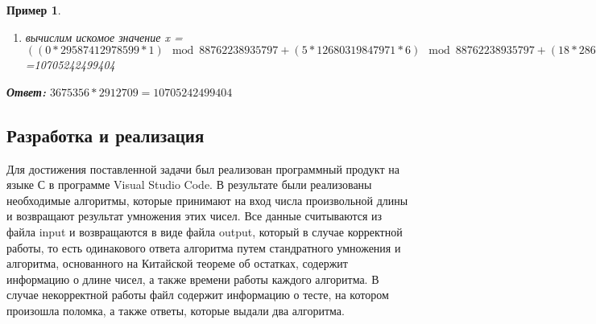 \documentclass[14pt, russian]{scrartcl}
\newcounter{cExample}
\newtheorem{Example}{Пример}[cExample]
\begin{document}
\begin{Example}
{\begin{enumerate}
    \begin{equation*}
        \begin{cases}
        M_{1}^{-1}=1, 
        \\
        M_{2}^{-1}=6,
        \\
        M_{3}^{-1}=3,
        \\
        M_{4}^{-1}=34,
        \\
        M_{5}^{-1}=5969,
        \\
        M_{6}^{-1}=93887.
        \end{cases}
    \end{equation*}
    \item вычислим искомое значение x = $((0*29587412978599*1)\mod88762238935797+(5*12680319847971*6)\mod88762238935797+(18*2863298030187*3)\mod88762238935797+(102*698915267211*34)\mod88762238935797+(2537*10836557067*5969)\mod88762238935797+(93393*677207307*93887)\mod88762238935797)\mod88762238935797$=10705242499404
\end{enumerate}
}
\textbf{Ответ:} $3675356*2912709=10705242499404$ 
\end{Example}

\subsection{Разработка и реализация}
Для достижения поставленной задачи был реализован программный продукт на языке С в программе Visual Studio Code. В результате были реализованы необходимые алгоритмы, которые принимают на вход числа произвольной длины и возвращают результат умножения  этих чисел. Все данные считываются из файла input и возвращаются в виде файла output, который в случае корректной работы, то есть одинакового ответа алгоритма путем стандратного умножения и алгоритма, основанного на Китайской теореме об остатках, содержит информацию о длине чисел, а также времени работы каждого алгоритма. В случае некорректной работы файл содержит информацию о тесте, на котором произошла поломка, а также ответы, которые выдали два алгоритма. 
\end{document}

